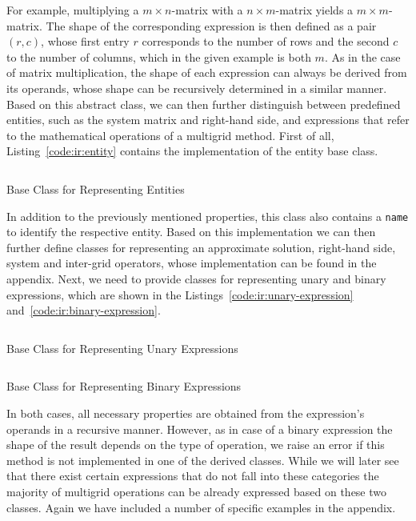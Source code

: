 For example, multiplying a $m \times n$-matrix with a $n \times m$-matrix yields a $m \times m$-matrix.
The shape of the corresponding expression is then defined as a pair $(r, c)$, whose first entry $r$ corresponds to the number of rows and the second $c$ to the number of columns, which in the given example is both $m$.
As in the case of matrix multiplication, the shape of each expression can always be derived from its operands, whose shape can be recursively determined in a similar manner.
Based on this abstract class, we can then further distinguish between predefined entities, such as the system matrix and right-hand side, and expressions that refer to the mathematical operations of a multigrid method.
First of all, Listing~\ref{code:ir:entity} contains the implementation of the entity base class.
\begin{listing}
	\inputminted{python}{evostencils/ir/entity.py}
	\caption{Base Class for Representing Entities}
	\label{code:ir:entity}
\end{listing}
In addition to the previously mentioned properties, this class also contains a \texttt{name} to identify the respective entity.
Based on this implementation we can then further define classes for representing an approximate solution, right-hand side, system and inter-grid operators, whose implementation can be found in the appendix.
Next, we need to provide classes for representing unary and binary expressions, which are shown in the Listings~\ref{code:ir:unary-expression} and~\ref{code:ir:binary-expression}.
\begin{listing}
	\inputminted{python}{evostencils/ir/unary_expression.py}
	\caption{Base Class for Representing Unary Expressions}
	\label{code:ir:unary-expression}
\end{listing}
\begin{listing}
	\inputminted{python}{evostencils/ir/binary_expression.py}
	\caption{Base Class for Representing Binary Expressions}
	\label{code:ir:binary-expression}
\end{listing}
In both cases, all necessary properties are obtained from the expression's operands in a recursive manner.
However, as in case of a binary expression the shape of the result depends on the type of operation, we raise an error if this method is not implemented in one of the derived classes. 
While we will later see that there exist certain expressions that do not fall into these categories the majority of multigrid operations can be already expressed based on these two classes.
Again we have included a number of specific examples in the appendix.
